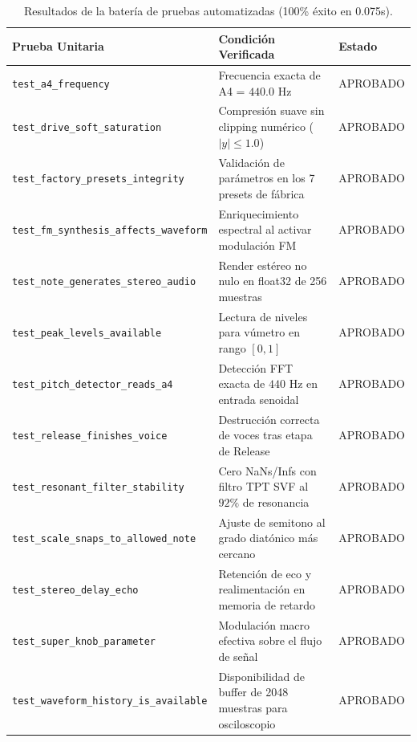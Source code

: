\documentclass[11pt,a4paper]{article}
\begin{document}
\begin{table}[h]
\centering
\small
\begin{tabular}{@{}lll@{}}
\toprule
\textbf{Prueba Unitaria} & \textbf{Condición Verificada} & \textbf{Estado} \\ \midrule
\texttt{test\_a4\_frequency} & Frecuencia exacta de A4 = $440.0\text{ Hz}$ & APROBADO \\
\texttt{test\_drive\_soft\_saturation} & Compresión suave sin clipping numérico ($|y| \le 1.0$) & APROBADO \\
\texttt{test\_factory\_presets\_integrity} & Validación de parámetros en los 7 presets de fábrica & APROBADO \\
\texttt{test\_fm\_synthesis\_affects\_waveform} & Enriquecimiento espectral al activar modulación FM & APROBADO \\
\texttt{test\_note\_generates\_stereo\_audio} & Render estéreo no nulo en float32 de 256 muestras & APROBADO \\
\texttt{test\_peak\_levels\_available} & Lectura de niveles para vúmetro en rango $[0, 1]$ & APROBADO \\
\texttt{test\_pitch\_detector\_reads\_a4} & Detección FFT exacta de $440\text{ Hz}$ en entrada senoidal & APROBADO \\
\texttt{test\_release\_finishes\_voice} & Destrucción correcta de voces tras etapa de Release & APROBADO \\
\texttt{test\_resonant\_filter\_stability} & Cero NaNs/Infs con filtro TPT SVF al $92\%$ de resonancia & APROBADO \\
\texttt{test\_scale\_snaps\_to\_allowed\_note} & Ajuste de semitono al grado diatónico más cercano & APROBADO \\
\texttt{test\_stereo\_delay\_echo} & Retención de eco y realimentación en memoria de retardo & APROBADO \\
\texttt{test\_super\_knob\_parameter} & Modulación macro efectiva sobre el flujo de señal & APROBADO \\
\texttt{test\_waveform\_history\_is\_available} & Disponibilidad de buffer de 2048 muestras para osciloscopio & APROBADO \\ \bottomrule
\end{tabular}
\caption{Resultados de la batería de pruebas automatizadas (100\% éxito en 0.075s).}
\end{table}

\end{document}
